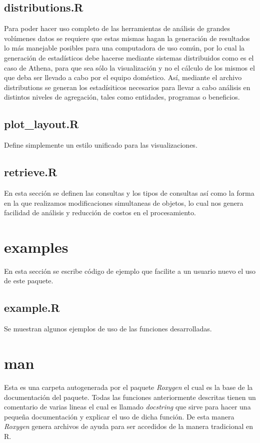 \subsection{distributions.R}
Para poder hacer uso completo de las herramientas de análisis de grandes volúmenes datos se requiere que estas mismas hagan la generación de resultados lo más manejable posibles para una computadora de uso común, por lo cual la generación de estadísticos debe hacerse mediante sistemas distribuidos como es el caso de Athena, para que sea sólo la visualización y no el cálculo de los mismos el que deba ser llevado a cabo por el equipo doméstico. Así, mediante el archivo distributions se generan los estadísiticos necesarios para llevar a cabo análisis en distintos niveles de agregación, tales como entidades, programas o beneficios.

\subsection{plot_layout.R}
Define simplemente un estilo unificado para las visualizaciones.

\subsection{retrieve.R}
En esta sección se definen las consultas y los tipos de consultas así como la forma en la que realizamos modificaciones simultaneas de objetos, lo cual nos genera facilidad de análisis y reducción de costos en el procesamiento.

\section{examples}
En esta sección se escribe código de ejemplo que facilite a un usuario nuevo el uso de este paquete.
\subsection{example.R}
Se muestran algunos ejemplos de uso de las funciones desarrolladas.

\section{man}
Esta es una carpeta autogenerada por el paquete \textit{Roxygen} el cual es la base de la documentación del paquete. Todas las funciones anteriormente descritas tienen un comentario de varias lineas el cual es llamado \textit{docstring} que sirve para hacer una pequeña documentación y explicar el uso de dicha función. De esta manera \textit{Roxygen} genera archivos de ayuda para ser accedidos de la manera tradicional en R.
